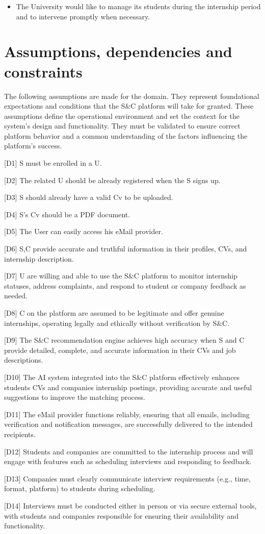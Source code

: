 \begin{itemize}
\item
  The University would like to manage its students during the internship
  period and to intervene promptly when necessary.
\end{itemize}

\section{Assumptions, dependencies and constraints}
\label{sec:assumptions_dependencies_constraints}%

The following assumptions are made for the domain. They represent
foundational expectations and conditions that the S\&C platform will
take for granted. These assumptions define the operational environment
and set the context for the system's design and functionality. They must
be validated to ensure correct platform behavior and a common
understanding of the factors influencing the platform's success.

{[}D1{]} S must be enrolled in a U.

{[}D2{]} The related U should be already registered when the S signs up.

{[}D3{]} S should already have a valid Cv to be uploaded.

{[}D4{]} S's Cv should be a PDF document.

{[}D5{]} The User can easily access his eMail provider.

{[}D6{]} S,C provide accurate and truthful information in their
profiles, CVs, and internship description.

{[}D7{]} U are willing and able to use the S\&C platform to monitor
internship statuses, address complaints, and respond to student or
company feedback as needed.

{[}D8{]} C on the platform are assumed to be legitimate and offer
genuine internships, operating legally and ethically without
verification by S\&C.

{[}D9{]} The S\&C recommendation engine achieves high accuracy when S
and C provide detailed, complete, and accurate information in their CVs
and job descriptions.

{[}D10{]} The AI system integrated into the S\&C platform effectively
enhances students\textquotesingle{} CVs and companies\textquotesingle{}
internship postings, providing accurate and useful suggestions to
improve the matching process.

{[}D11{]} The eMail provider functions reliably, ensuring that all
emails, including verification and notification messages, are
successfully delivered to the intended recipients.

{[}D12{]} Students and companies are committed to the internship process
and will engage with features such as scheduling interviews and
responding to feedback.

{[}D13{]} Companies must clearly communicate interview requirements
(e.g., time, format, platform) to students during scheduling.

{[}D14{]} Interviews must be conducted either in person or via secure
external tools, with students and companies responsible for ensuring
their availability and functionality.
